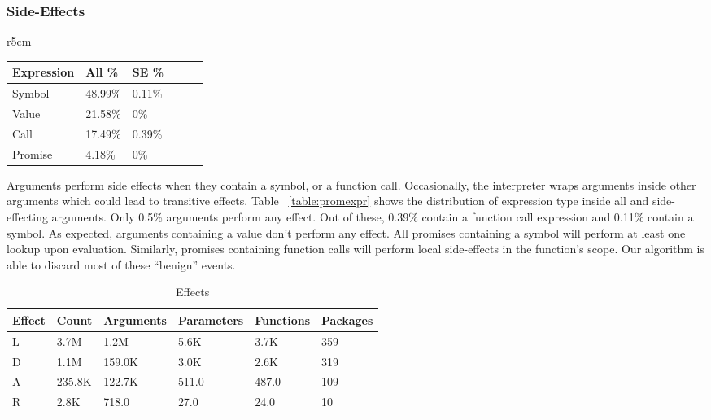 \documentclass[review,nonacm,screen,acmsmall,anonymous=true]{acmart}
\begin{document}
\subsubsection{Side-Effects}

\begin{wraptable}{r}{5cm}
  \vspace{-3mm}
  \small
  \caption{Promise Expression} \label{table:promexpr}
  \centering
  \begin{tabular}{llllll}
    \toprule
    \textbf{Expression}&\textbf{All \%}&\textbf{SE \%}\\
    \midrule
    Symbol&48.99\%&0.11\%\\
    Value&21.58\%&0\%\\
    Call&17.49\%&0.39\%\\
    Promise&4.18\%&0\%\\
    \bottomrule
  \end{tabular}
\end{wraptable}

Arguments perform side effects when they contain a symbol, or a function call.
Occasionally, the interpreter wraps arguments inside other arguments which could
lead to transitive effects. Table ~\ref{table:promexpr} shows the distribution
of expression type inside all and side-effecting arguments. Only 0.5\% arguments
perform any effect. Out of these, 0.39\% contain a function call expression and
0.11\% contain a symbol. As expected, arguments containing a value don't perform
any effect. All promises containing a symbol will perform at least one lookup
upon evaluation. Similarly, promises containing function calls will perform
local side-effects in the function's scope. Our algorithm is able to discard
most of these ``benign'' events.

\begin{table}[!h]
  \vspace{-3mm}
  \small
  \caption{Effects} \label{table:effects}
  \centering
  \begin{tabular}{llllll}
    \toprule
    \textbf{Effect}&\textbf{Count}&\textbf{Arguments}&\textbf{Parameters}&\textbf{Functions}&\textbf{Packages}\\
    \midrule
    L&3.7M&1.2M&5.6K&3.7K&359\\
    D&1.1M&159.0K&3.0K&2.6K&319\\
    A&235.8K&122.7K&511.0&487.0&109\\
    R&2.8K&718.0&27.0&24.0&10\\
    \bottomrule
  \end{tabular}
\end{table}
\end{document}
